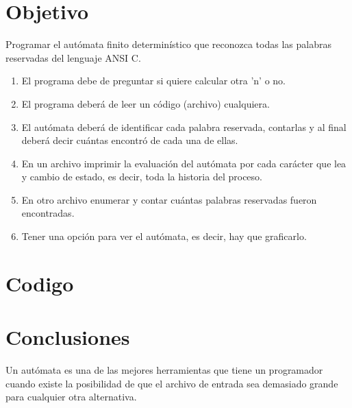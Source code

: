 \documentclass{article}
\begin{document}
	\section{Objetivo}
	Programar el autómata finito determinístico que reconozca todas las palabras reservadas del lenguaje ANSI C.
\begin{enumerate}
	\item  El programa debe de preguntar si quiere calcular otra 'n' o no.
	\item  El programa deberá de leer un código (archivo) cualquiera.
	\item  El autómata deberá de identificar cada palabra reservada, contarlas y al final deberá decir cuántas encontró de cada una de ellas.
	\item  En un archivo imprimir la evaluación del autómata por cada carácter que lea y cambio de estado, es decir, toda la historia del proceso.
	\item  En otro archivo enumerar y contar cuántas palabras reservadas fueron encontradas.
	\item  Tener una opción para ver el autómata, es decir, hay que graficarlo.
\end{enumerate}
	
	\section{Codigo}
	
	\section{Conclusiones}
	Un autómata es una de las mejores herramientas que tiene un programador cuando existe la posibilidad de que el archivo de entrada sea demasiado grande para cualquier otra alternativa.
\end{document}
